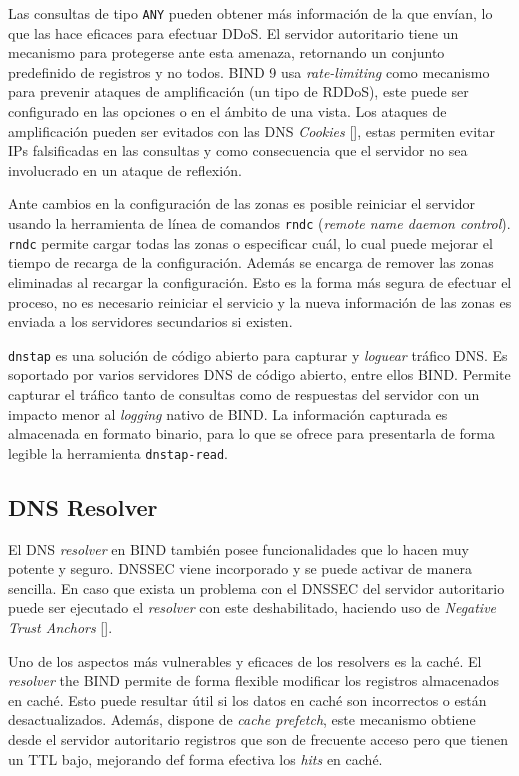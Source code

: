 Las consultas de tipo \verb+ANY+ pueden obtener más información de la que envían, lo que las hace eficaces para efectuar DDoS. El servidor autoritario tiene un mecanismo para protegerse ante esta amenaza, retornando un conjunto predefinido de registros y no todos. BIND 9 usa \textit{rate-limiting} como mecanismo para prevenir ataques de amplificación (un tipo de RDDoS), este puede ser configurado en las opciones o en el ámbito de una vista. Los ataques de amplificación pueden ser evitados con las DNS \textit{Cookies} [\cite{rfc_7873}], estas permiten evitar IPs falsificadas en las consultas y como consecuencia que el servidor no sea involucrado en un ataque de reflexión.

Ante cambios en la configuración de las zonas es posible reiniciar el servidor usando la herramienta de línea de comandos \verb+rndc+ (\textit{remote name daemon control}). \verb+rndc+ permite cargar todas las zonas o especificar cuál, lo cual puede mejorar el tiempo de recarga de la configuración. Además se encarga de remover las zonas eliminadas al recargar la configuración. Esto es la forma más segura de efectuar el proceso, no es necesario reiniciar el servicio y la nueva información de las zonas es enviada a los servidores secundarios si existen.

\verb+dnstap+ es una solución de código abierto para capturar y \textit{loguear} tráfico DNS. Es soportado por varios servidores DNS de código abierto, entre ellos BIND. Permite capturar el tráfico tanto de consultas como de respuestas del servidor con un impacto menor al \textit{logging} nativo de BIND. La información capturada es almacenada en formato binario, para lo que se ofrece para presentarla de forma legible la herramienta \verb+dnstap-read+. 

\subsection{DNS Resolver}

El DNS \textit{resolver} en BIND también posee funcionalidades que lo hacen muy potente y seguro. DNSSEC viene incorporado y se puede activar de manera sencilla. En caso que exista un problema con el DNSSEC del servidor autoritario puede ser ejecutado el \textit{resolver} con este deshabilitado, haciendo uso de \textit{Negative Trust Anchors} [\cite{rfc_7646}].

Uno de los aspectos más vulnerables y eficaces de los resolvers es la caché. El \textit{resolver} the BIND permite de forma flexible modificar los registros almacenados en caché. Esto puede resultar útil si los datos en caché son incorrectos o están desactualizados. Además, dispone de \textit{cache prefetch}, este mecanismo obtiene desde el servidor autoritario registros que son de frecuente acceso pero que tienen un TTL bajo, mejorando def forma efectiva los \textit{hits} en caché.

